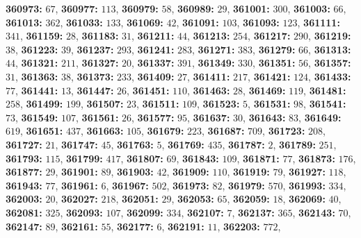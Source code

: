 \textsf{\bfseries 360973:} $67$, \textsf{\bfseries 360977:} $113$, \textsf{\bfseries 360979:} $58$, \textsf{\bfseries 360989:} $29$, \textsf{\bfseries 361001:} $300$, \textsf{\bfseries 361003:} $66$, \textsf{\bfseries 361013:} $362$, \textsf{\bfseries 361033:} $133$, \textsf{\bfseries 361069:} $42$, \textsf{\bfseries 361091:} $103$, \textsf{\bfseries 361093:} $123$, \textsf{\bfseries 361111:} $341$, \textsf{\bfseries 361159:} $28$, \textsf{\bfseries 361183:} $31$, \textsf{\bfseries 361211:} $44$, \textsf{\bfseries 361213:} $254$, \textsf{\bfseries 361217:} $290$, \textsf{\bfseries 361219:} $38$, \textsf{\bfseries 361223:} $39$, \textsf{\bfseries 361237:} $293$, \textsf{\bfseries 361241:} $283$, \textsf{\bfseries 361271:} $383$, \textsf{\bfseries 361279:} $66$, \textsf{\bfseries 361313:} $44$, \textsf{\bfseries 361321:} $211$, \textsf{\bfseries 361327:} $20$, \textsf{\bfseries 361337:} $391$, \textsf{\bfseries 361349:} $330$, \textsf{\bfseries 361351:} $56$, \textsf{\bfseries 361357:} $31$, \textsf{\bfseries 361363:} $38$, \textsf{\bfseries 361373:} $233$, \textsf{\bfseries 361409:} $27$, \textsf{\bfseries 361411:} $217$, \textsf{\bfseries 361421:} $124$, \textsf{\bfseries 361433:} $77$, \textsf{\bfseries 361441:} $13$, \textsf{\bfseries 361447:} $26$, \textsf{\bfseries 361451:} $110$, \textsf{\bfseries 361463:} $28$, \textsf{\bfseries 361469:} $119$, \textsf{\bfseries 361481:} $258$, \textsf{\bfseries 361499:} $199$, \textsf{\bfseries 361507:} $23$, \textsf{\bfseries 361511:} $109$, \textsf{\bfseries 361523:} $5$, \textsf{\bfseries 361531:} $98$, \textsf{\bfseries 361541:} $73$, \textsf{\bfseries 361549:} $107$, \textsf{\bfseries 361561:} $26$, \textsf{\bfseries 361577:} $95$, \textsf{\bfseries 361637:} $30$, \textsf{\bfseries 361643:} $83$, \textsf{\bfseries 361649:} $619$, \textsf{\bfseries 361651:} $437$, \textsf{\bfseries 361663:} $105$, \textsf{\bfseries 361679:} $223$, \textsf{\bfseries 361687:} $709$, \textsf{\bfseries 361723:} $208$, \textsf{\bfseries 361727:} $21$, \textsf{\bfseries 361747:} $45$, \textsf{\bfseries 361763:} $5$, \textsf{\bfseries 361769:} $435$, \textsf{\bfseries 361787:} $2$, \textsf{\bfseries 361789:} $251$, \textsf{\bfseries 361793:} $115$, \textsf{\bfseries 361799:} $417$, \textsf{\bfseries 361807:} $69$, \textsf{\bfseries 361843:} $109$, \textsf{\bfseries 361871:} $77$, \textsf{\bfseries 361873:} $176$, \textsf{\bfseries 361877:} $29$, \textsf{\bfseries 361901:} $89$, \textsf{\bfseries 361903:} $42$, \textsf{\bfseries 361909:} $110$, \textsf{\bfseries 361919:} $79$, \textsf{\bfseries 361927:} $118$, \textsf{\bfseries 361943:} $77$, \textsf{\bfseries 361961:} $6$, \textsf{\bfseries 361967:} $502$, \textsf{\bfseries 361973:} $82$, \textsf{\bfseries 361979:} $570$, \textsf{\bfseries 361993:} $334$, \textsf{\bfseries 362003:} $20$, \textsf{\bfseries 362027:} $218$, \textsf{\bfseries 362051:} $29$, \textsf{\bfseries 362053:} $65$, \textsf{\bfseries 362059:} $18$, \textsf{\bfseries 362069:} $40$, \textsf{\bfseries 362081:} $325$, \textsf{\bfseries 362093:} $107$, \textsf{\bfseries 362099:} $334$, \textsf{\bfseries 362107:} $7$, \textsf{\bfseries 362137:} $365$, \textsf{\bfseries 362143:} $70$, \textsf{\bfseries 362147:} $89$, \textsf{\bfseries 362161:} $55$, \textsf{\bfseries 362177:} $6$, \textsf{\bfseries 362191:} $11$, \textsf{\bfseries 362203:} $772$, 
